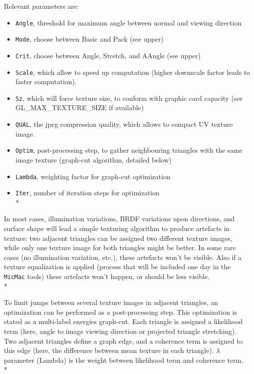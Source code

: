 Relevant parameters are:
\begin{itemize}
\item {\tt Angle}, threshold for maximum angle between normal and viewing direction
\item {\tt Mode}, choose between Basic and Pack (see upper)
\item {\tt Crit}, choose between Angle, Stretch, and AAngle (see upper)
\item {\tt Scale}, which allow to speed up computation (higher downscale factor leads to faster computation).
\item {\tt Sz}, which will force texture size, to conform with graphic card capacity (see GL\_MAX\_TEXTURE\_SIZE if available)
\item {\tt QUAL}, the jpeg compression quality, which allows to compact UV texture image.
\item {\tt Optim}, post-processing step, to gather neighbouring triangles with the same image texture (graph-cut algorithm, detailed below)
\item {\tt Lambda}, weighting factor for graph-cut optimization
\item {\tt Iter}, number of iteration steps for optimization\\*
\end{itemize}

In most cases, illumination variations, BRDF variations upon directions, and surface shape will lead a simple texturing algorithm to produce artefacts in texture: two adjacent triangles can be assigned two different texture images, while only one texture image for both triangles might be better.
In some rare cases (no illumination variation, etc.), these artefacts won't be visible. Also if a texture equalization is applied (process that will be included one day in the {\tt MicMac} tools) these artefacts won't happen, or should be less visible.\\*

To limit jumps between several texture images in adjacent triangles, an optimization can be performed as a post-processing step. This optimization is stated as a multi-label energies graph-cut.
Each triangle is assigned a likelihood term (here, angle to image viewing direction or projected triangle stretching).
Two adjacent triangles define a graph edge, and a coherence term is assigned to this edge (here, the difference between mean texture in each triangle).
$\lambda$ parameter (Lambda) is the weight between likelihood term and coherence term.\\*


